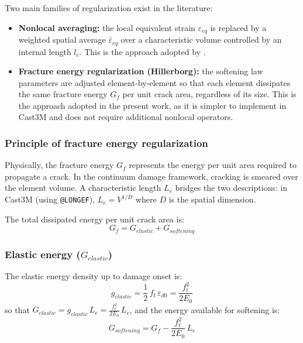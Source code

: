 Two main families of regularization exist in the literature:
\begin{itemize}
    \item \textbf{Nonlocal averaging:} the local equivalent strain $\varepsilon_{eq}$ is replaced by a weighted spatial average $\bar{\varepsilon}_{eq}$ over a characteristic volume controlled by an internal length $l_c$. This is the approach adopted by \cite{dauti2018}.
    
    \item \textbf{Fracture energy regularization (Hillerborg):} the softening law parameters are adjusted element-by-element so that each element dissipates the same fracture energy $G_f$ per unit crack area, regardless of its size. This is the approach adopted in the present work, as it is simpler to implement in Cast3M and does not require additional nonlocal operators.
\end{itemize}

\subsubsection{Principle of fracture energy regularization}

Physically, the fracture energy $G_f$ represents the energy per unit area required to propagate a crack. In the continuum damage framework, cracking is smeared over the element volume. A characteristic length $L_e$ bridges the two descriptions: in Cast3M (using \texttt{@LONGEF}), $L_e = V^{1/D}$ where $D$ is the spatial dimension.

The total dissipated energy per unit crack area is:
\begin{equation}
    G_f = G_{elastic} + G_{softening}
\end{equation}

\subsubsection{Elastic energy ($G_{elastic}$)}

The elastic energy density up to damage onset is:
\begin{equation}
    g_{elastic} = \frac{1}{2}\,f_t\,\varepsilon_{d0} 
    = \frac{f_t^2}{2E_0}
\end{equation}
so that $G_{elastic} = g_{elastic}\,L_e = \frac{f_t^2}{2E_0}\,L_e$, and the energy available for softening is:
\begin{equation}
    G_{softening} = G_f 
    - \frac{f_t^2}{2E_0}\,L_e
\end{equation}

